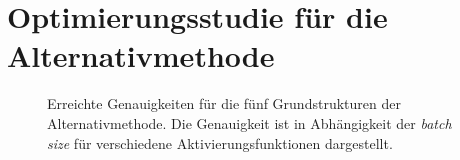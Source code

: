 \chapter{Optimierungsstudie für die Alternativmethode}
%
\begin{figure}[h!]
  \hspace{20pt}
  \renewcommand{\baselinestretch}{1.0}
  \caption{Erreichte Genauigkeiten für die fünf Grundstrukturen der Alternativmethode. Die Genauigkeit ist in Abhängigkeit der \textit{batch size} für verschiedene Aktivierungsfunktionen dargestellt.}
  \renewcommand{\baselinestretch}{1.5}
  \label{fig:accs}
\end{figure}
